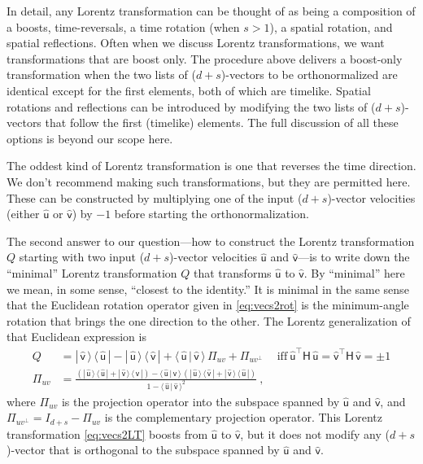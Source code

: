 \documentclass{article}
\newcommand{\metric}{\mathsf{H}}
\newcommand{\proj}{\mathsf{\Pi}}
\newcommand{\Lhat}[1]{\hat{\mathsf{#1}}} %
\newcommand{\braket}[2]{\langle\,{#1}\,|\,{#2}\,\rangle}
\newcommand{\ketbra}[2]{|\,{#1}\,\rangle\,\langle\,{#2}\,|}
\newcommand{\plus}{\!+\!} %
\begin{document}
In detail, any Lorentz transformation can be thought of as being a composition of a boosts, time-reversals, a time rotation (when $s>1$), a spatial rotation, and spatial reflections.
Often when we discuss Lorentz transformations, we want transformations that are boost only.
The procedure above delivers a boost-only transformation when the two lists of ($d\plus s$)-vectors to be orthonormalized are identical except for the first elements, both of which are timelike.
Spatial rotations and reflections can be introduced by modifying the two lists of ($d\plus s$)-vectors that follow the first (timelike) elements.
The full discussion of all these options is beyond our scope here.

The oddest kind of Lorentz transformation is one that reverses the time direction.
We don't recommend making such transformations, but they are permitted here.
These can be constructed by multiplying one of the input ($d\plus s$)-vector velocities (either $\Lhat{u}$ or $\Lhat{v}$) by $-1$ before starting the orthonormalization.

The second answer to our question---how to construct the Lorentz transformation $Q$ starting with two input ($d\plus s$)-vector velocities $\Lhat{u}$ and $\Lhat{v}$---is to write down the ``minimal'' Lorentz transformation $Q$ that transforms $\Lhat{u}$ to $\Lhat{v}$.
By ``minimal'' here we mean, in some sense, ``closest to the identity.''
It is minimal in the same sense that the Euclidean rotation operator given in \eqref{eq:vecs2rot} is the minimum-angle rotation that brings the one direction to the other.
The Lorentz generalization of that Euclidean expression is
\begin{align}
    Q &= \ketbra{\Lhat{v}}{\Lhat{u}} - \ketbra{\Lhat{u}}{\Lhat{v}} + \braket{\Lhat{u}}{\Lhat{v}}\,\proj_{uv} + \proj_{uv^\perp} \quad~ \mbox{iff} ~ \Lhat{u}^\top\metric\,\Lhat{u} = \Lhat{v}^\top\metric\,\Lhat{v} = \pm 1 \label{eq:vecs2LT} \\
    \proj_{uv} &= \frac{\left(\ketbra{\Lhat{u}}{\Lhat{u}} + \ketbra{\Lhat{v}}{\Lhat{v}}\right) - \braket{\Lhat{u}}{\Lhat{v}}\,\left(\ketbra{\Lhat{u}}{\Lhat{v}} + \ketbra{\Lhat{v}}{\Lhat{u}}\right)}{1 - \braket{\Lhat{u}}{\Lhat{v}}^2} ~,
\end{align}
where $\proj_{uv}$ is the projection operator into the subspace spanned by $\Lhat{u}$ and $\Lhat{v}$,
and $\proj_{uv^\perp} = I_{d+s} - \proj_{uv}$ is the complementary projection operator.
This Lorentz transformation \eqref{eq:vecs2LT} boosts from $\Lhat{u}$ to $\Lhat{v}$, but it does not modify any ($d\plus s$)-vector that is orthogonal to the subspace spanned by $\Lhat{u}$ and $\Lhat{v}$.
\end{document}
